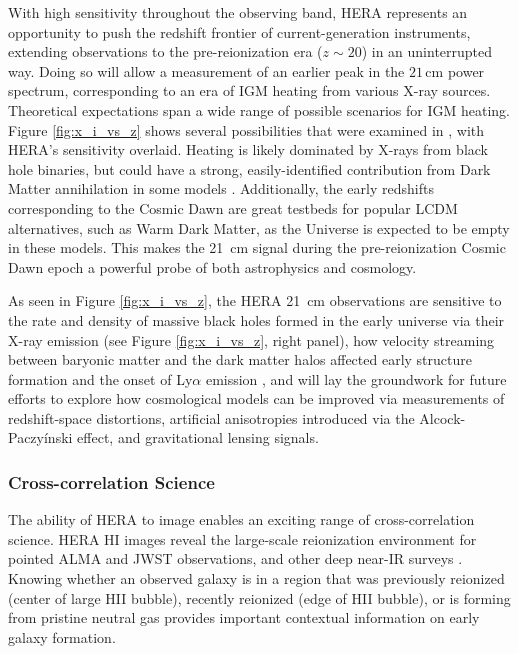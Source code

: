\documentclass[preprint]{aastex}
\begin{document}
With high sensitivity throughout the observing band, HERA represents an opportunity to push the redshift 
frontier of current-generation instruments, extending observations to the pre-reionization era ($z \sim 20$)
in an  uninterrupted way.  Doing so will allow a measurement of an earlier peak in the $21\,\textrm{cm}$ power 
spectrum, corresponding to an era of IGM heating from various X-ray sources.  Theoretical expectations 
span a wide range of possible scenarios for IGM heating. Figure \ref{fig:x_i_vs_z} shows several possibilities that 
were examined in \cite{mesinger_et_al2013}, with HERA's sensitivity overlaid.  
Heating is likely dominated by X-rays from black
hole binaries, but could have a strong, easily-identified contribution from
Dark Matter annihilation in some models \citep{mesinger_et_al2013}.  Additionally, the early redshifts
corresponding to the Cosmic Dawn are great testbeds for popular LCDM
alternatives, such as Warm Dark Matter, as the Universe is expected to be empty
in these models.  This makes the 21~cm signal during the pre-reionization Cosmic
Dawn epoch a powerful probe of both astrophysics and cosmology. 

As seen in  Figure \ref{fig:x_i_vs_z}, the HERA 21~cm observations are sensitive to 
the rate and density of massive black holes formed in the
early universe \citep{pritchard_loeb2010} via their X-ray emission (see Figure \ref{fig:x_i_vs_z}, right panel), 
how velocity streaming between baryonic 
matter and the dark matter halos affected early structure formation and the onset
of Ly$\alpha$ emission \citep{visbal_et_al2012}, and will lay the groundwork for future
efforts to explore how 
cosmological models can be improved via measurements of redshift-space distortions,
artificial anisotropies introduced via the Alcock-Paczy\'inski effect, and
gravitational lensing signals\citep{furlanetto_et_al2006}.


\subsubsection{Cross-correlation Science}
\label{sec:CrossCorrelation}

The ability of HERA to image enables an exciting range of cross-correlation science. 
HERA HI images reveal the large-scale reionization environment for pointed ALMA and JWST 
observations, and other deep near-IR surveys \citep{lidz_et_al2009}.  
Knowing whether an observed galaxy is in a region that  was
previously reionized (center of large HII bubble), recently reionized (edge of HII bubble), or is forming from 
pristine neutral gas provides important contextual information on early galaxy formation.
\end{document}

